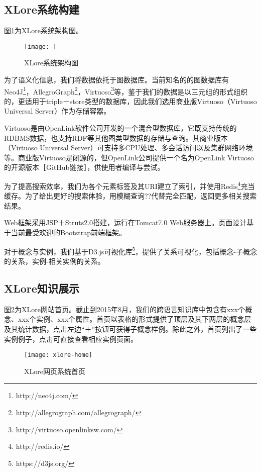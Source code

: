 \subsection{XLore系统构建}
图\ref{fig:xlore-architecture}为XLore系统架构图。

\begin{figure}[H] 
  \centering
  \texttt{[image: ]}
  \caption{XLore系统架构图}
  \label{fig:xlore-architecture}
\end{figure}

为了语义化信息，我们将数据依托于图数据库。当前知名的的图数据库有Neo4J\footnote{http://neo4j.com/}，AllegroGraph\footnote{http://allegrograph.com/allegrograph/}，Virtuoso\footnote{http://virtuoso.openlinksw.com/}等，鉴于我们的数据是以三元组的形式组织的，更适用于triple－store类型的数据库，因此我们选用商业版Virtuoso（Virtuoso Universal Server）作为存储容器。

Virtuoso是由OpenLink软件公司开发的一个混合型数据库，它既支持传统的RDBMS数据，也支持RDF等其他图类型数据的存储与查询。其商业版本（Virtuoso Universal Server）可支持多CPU处理、多会话访问以及集群网络环境等。商业版Virtuoso是闭源的，但OpenLink公司提供一个名为OpenLink Virtuoso的开源版本［GitHub链接］，供使用者编译与尝试。

为了提高搜索效率，我们为各个元素标签及其URI建立了索引，并使用Redis\footnote{http://redis.io/}充当缓存。为了给出更好的搜索体验，用模糊查询??代替完全匹配，返回更多相关搜索结果。

Web框架采用JSP＋Struts2.0搭建，运行在Tomcat7.0 Web服务器上。页面设计基于当前最受欢迎的Bootstrap前端框架。

对于概念与实例，我们基于D3.js可视化库\footnote{https://d3js.org/}，提供了关系可视化，包括概念-子概念的关系，实例-相关实例的关系。

\subsection{XLore知识展示}
图\ref{fig:xlore-home}为XLore网站首页。截止到2015年8月，我们的跨语言知识库中包含有xxx个概念、xxx个实例、xxx个属性。首页以表格的形式提供了顶层及其下两层的概念层及其统计数据，点击左边“＋”按钮可获得子概念样例。除此之外，首页列出了一些实例例子，点击可直接查看相应实例页面。

\begin{figure}[H] 
  \centering
  \texttt{[image: xlore-home]}
  \caption{XLore网页系统首页}
  \label{fig:xlore-home}
\end{figure}

